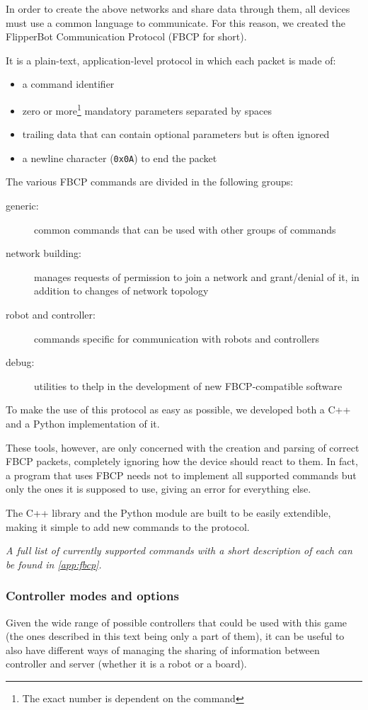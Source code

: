 In order to create the above networks and share data through them,
all devices must use a common language to communicate.
For this reason, we created the FlipperBot Communication Protocol
(FBCP for short).

\beforelist It is a plain-text, application-level protocol in which each packet
is made of:
\begin{itemize}
  \item a command identifier
  \item zero or more\footnote{The exact number is dependent on the
    command} mandatory parameters separated by spaces
  \item trailing data that can contain optional parameters but is
    often ignored
  \item a newline character (\texttt{0x0A}) to end the packet
\end{itemize}
\afterlist*
\beforelist The various FBCP commands are divided in the following groups:
\begin{description}
  \item[generic:] common commands that can be used with
    other groups of commands
  \item[network building:] manages requests of permission to
    join a network and grant/denial of it, in addition to changes of
    network topology
  \item[robot and controller:] commands specific
    for communication with robots and controllers
  \item[debug:] utilities to thelp in the development of new
    FBCP-compatible software
\end{description}
\afterlist*
To make the use of this protocol as easy as possible, we developed both
a C++ and a Python implementation of it.

These tools, however, are only concerned with the creation and
parsing of correct FBCP packets, completely ignoring how the device
should react to them. In fact, a program that uses FBCP needs not to
implement all supported commands but only the ones it is supposed to
use, giving an error for everything else.

The C++ library and the Python module are built to be easily
extendible, making it simple to add new commands to the protocol.

\textit{A full list of currently supported commands with a short
description of each can be found in \autoref{app:fbcp}.}

\subsubsection{Controller modes and options}
  \label{sssec:optmode}
  Given the wide range of possible controllers that could be used
  with this game (the ones described in this text being only a part
  of them), it can be useful to also have different ways of managing
  the sharing of information between controller and server (whether
  it is a robot or a board).

